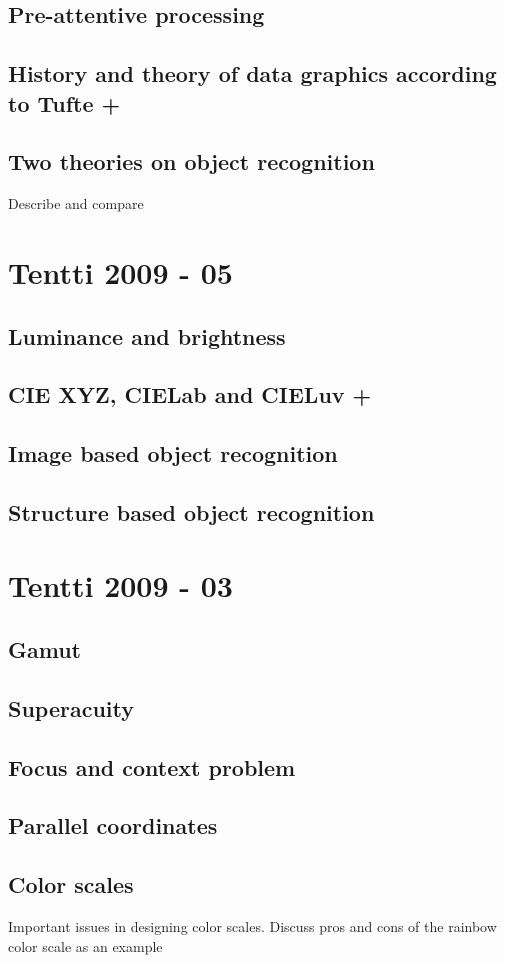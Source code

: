 \documentclass[a4paper]{article}
\begin{document}
\subsection{Pre-attentive processing}

\subsection{History and theory of data graphics according to Tufte +}

\subsection{Two theories on object recognition}

Describe and compare

\section{Tentti 2009 - 05}

\subsection{Luminance and brightness}

\subsection{CIE XYZ, CIELab and CIELuv +}

\subsection{Image based object recognition}

\subsection{Structure based object recognition}

\section{Tentti 2009 - 03}

\subsection{Gamut}

\subsection{Superacuity}

\subsection{Focus and context problem}

\subsection{Parallel coordinates}

\subsection{Color scales}

Important issues in designing color scales. Discuss pros and cons of the rainbow color scale as an example
\end{document}
